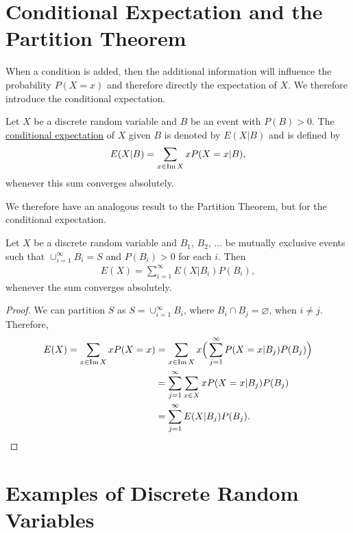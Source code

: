 \section{Conditional Expectation and the Partition Theorem}

When a condition is added, then the additional information will influence the probability $P (X = x)$ and therefore directly the expectation of $X$. We therefore introduce the conditional expectation.

\begin{definition}
Let $X$ be a discrete random variable and $B$ be an event with $P (B) > 0$. The \underline{conditional expectation} of $X$ given $B$ is denoted by $E (X | B)$ and is defined by
    \begin{align*}
    E (X | B) = \sum_{x \in \operatorname{Im} X} x P (X =x | B) ,
    \end{align*} 
whenever this sum converges absolutely.
\end{definition}

We therefore have an analogous result to the Partition Theorem, but for the conditional expectation.

\begin{theorem}
Let $X$ be a discrete random variable and $B_1$, $B_2$, $\ldots$ be mutually exclusive events such that $\cup_{i = 1}^\infty B_i = S$ and $P (B_i) > 0$ for each $i$. Then
    \begin{align*}
    E (X) = \sum_{i = 1}^\infty E (X |B_i) P (B_i) ,
    \end{align*} 
whenever the sum converges absolutely.
\end{theorem}
\begin{proof}
We can partition $S$ as $S = \cup_{i = 1}^\infty B_i$, where $B_i \cap B_j = \varnothing$, when $i \neq j$. Therefore,
    \begin{align*}
    E (X) = \sum_{x \in \operatorname{Im} X} x P (X = x) &= \sum_{x \in \operatorname{Im} X} x \Big( \sum_{j = 1}^\infty P (X = x | B_j ) P (B_j) \Big) \\
    &= \sum_{j = 1}^\infty \sum_{x \in X} x P (X = x | B_j) P (B_j) \\
    &= \sum_{j = 1}^\infty E (X | B_j) P (B_j) . \qedhere
    \end{align*}
\end{proof}

\section{Examples of Discrete Random Variables}

